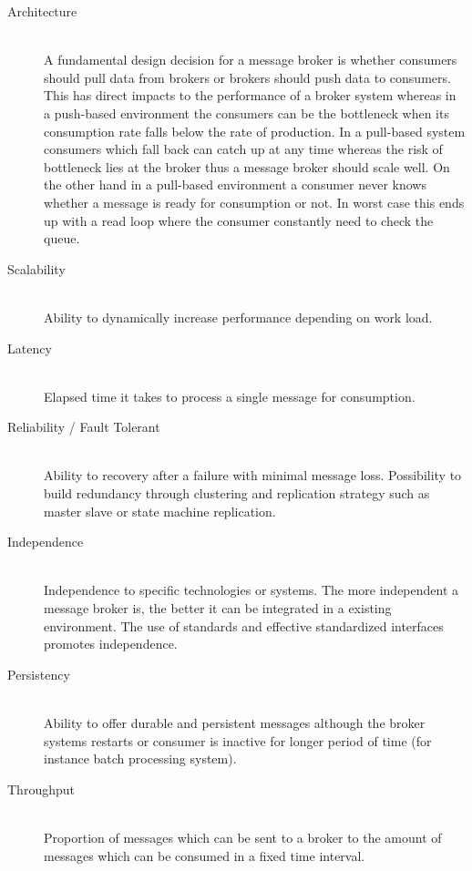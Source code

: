 \begin{description}
    \item [Architecture] \hfill \\
    { A fundamental design decision for a message broker is whether consumers
    should pull data from brokers or brokers should push data to consumers. This
has direct impacts to the performance of a broker system whereas in a push-based
environment the consumers can be the bottleneck when its consumption rate falls
below the rate of production. In a pull-based system consumers which fall back
can catch up at any time whereas the risk of bottleneck lies at the broker thus
 a message broker should scale well. On the other hand in a pull-based
 environment a consumer never knows whether a message is ready for consumption
 or not. In worst case this ends up with a read loop where the consumer
 constantly need to check the queue. \cite{apachekafka} }
    \item [Scalability] \hfill \\
    {Ability to dynamically increase performance depending on work load.  }
    \item [Latency]\hfill \\
    {Elapsed time it takes to process a single message for consumption.  }
    \item [Reliability / Fault Tolerant] \hfill \\
        {Ability to recovery after a failure with minimal message loss.
        Possibility to build redundancy through clustering and replication strategy such as
    master slave or state machine replication. }
    \item [Independence] \hfill \\
    { Independence to specific technologies or systems. The more independent a
        message broker is, the better it can be integrated in a existing
        environment. The use of standards and effective standardized interfaces
        promotes independence.}
    \item [Persistency] \hfill \\ 
        {Ability to offer durable and persistent messages although the broker
            systems restarts or consumer is inactive for longer period of time
            (for instance batch processing system). }
    \item [Throughput] \hfill \\
        {Proportion of messages which can be sent to a broker to the amount of
        messages which can be consumed in a fixed time interval.}
\end{description}

